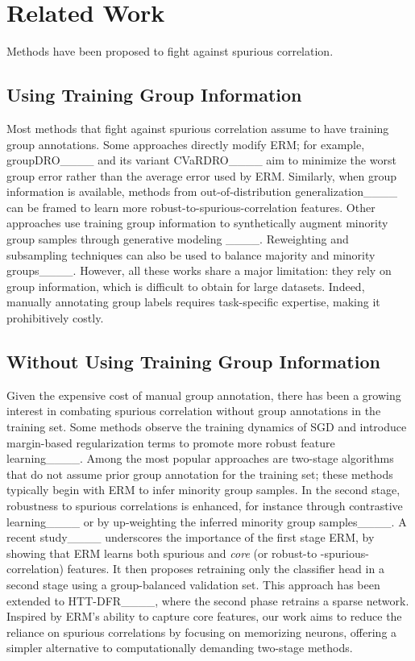 \section{Related Work}
\label{sec:related_work}
Methods have been proposed to fight against spurious correlation. 

\subsection{Using Training Group Information} Most methods that fight against spurious correlation assume to have training group annotations. Some approaches directly modify ERM; for example, groupDRO____ and its variant CVaRDRO____ aim to minimize the worst group error rather than the average error used by ERM. Similarly, when group information is available, methods from out-of-distribution generalization____ can be framed to learn more robust-to-spurious-correlation features. Other approaches use training group information to synthetically augment minority group samples through generative modeling ____. Reweighting and subsampling techniques can also be used to balance majority and minority groups____. However, all these works share a major limitation:  they rely on group information, which is difficult to obtain for large datasets. Indeed, manually annotating group labels requires task-specific expertise, making it prohibitively costly.

\subsection{Without Using Training Group Information} Given the expensive cost of manual group annotation, there has been a growing interest in combating spurious correlation without group annotations in the training set. Some methods observe the training dynamics of SGD and introduce margin-based regularization terms to promote more robust feature learning____. Among the most popular approaches are two-stage algorithms that do not assume prior group annotation for the training set; these methods typically begin with ERM to infer minority group samples. In the second stage, robustness to spurious correlations is enhanced, for instance through contrastive learning____ or by up-weighting the inferred minority group samples____. A recent study____ underscores the importance of the first stage ERM, by showing that ERM learns both spurious and \textit{core} (or robust-to -spurious-correlation) features. It then proposes retraining only the classifier head in a second stage using a group-balanced validation set. This approach has been extended to HTT-DFR____, where the second phase retrains a sparse network. Inspired by ERM’s ability to capture core features, our work aims to reduce the reliance on spurious correlations by focusing on memorizing neurons, offering a simpler alternative to computationally demanding two-stage methods.

